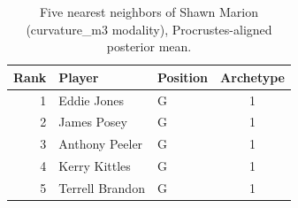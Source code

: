 \begin{table}[htbp]
  \centering\small
  \begin{tabular}{rllc}
    \toprule
    Rank & Player & Position & Archetype \\
    \midrule
    1 & Eddie Jones & G & 1 \\
    2 & James Posey & G & 1 \\
    3 & Anthony Peeler & G & 1 \\
    4 & Kerry Kittles & G & 1 \\
    5 & Terrell Brandon & G & 1 \\
    \bottomrule
  \end{tabular}
  \caption{Five nearest neighbors of Shawn Marion (curvature_m3 modality), Procrustes-aligned posterior mean.}
  \label{tab:Shawn_Marion_neighbors_curvature_m3}
\end{table}

